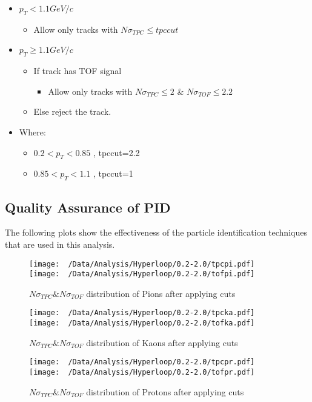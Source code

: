 \documentclass[ALICE,manyauthors]{ALICE_analysis_notes}
\begin{document}
\begin{enumerate}
	\begin{itemize}[label=@]
		\item $p_T<1.1GeV/c$
		\begin{itemize}[label=$\bullet$]
			\item Allow only tracks with $N\sigma_{TPC} \leq tpccut$
		\end{itemize}
		\item $p_T\geq 1.1GeV/c$
		\begin{itemize}[label=$\bullet$]
			\item If track has TOF signal
			\begin{itemize}[label=$\star$]
				\item Allow  only tracks with $N\sigma_{TPC} \leq 2$ \& $N\sigma_{TOF}\leq 2.2$
			\end{itemize}
			\item Else reject the track.
		\end{itemize}
		\item Where:	
		\begin{itemize}[label=]
			\item $0.2<p_T<0.85$ , tpccut=2.2
			\item $0.85<p_T<1.1$ , tpccut=1
		\end{itemize}
	\end{itemize}
\end{enumerate}
\subsection{Quality Assurance of PID}
The following plots show the effectiveness of the particle identification techniques that are used in this analysis. 
\begin{figure}[h!]
	\texttt{[image: ~/Data/Analysis/Hyperloop/0.2-2.0/tpcpi.pdf]}
	\texttt{[image: ~/Data/Analysis/Hyperloop/0.2-2.0/tofpi.pdf]}
	\caption{\label{Pion_nsigma}$N\sigma_{TPC}\&N\sigma_{TOF}$ distribution of Pions after applying cuts}
\end{figure}
\begin{figure}[h!]
	\texttt{[image: ~/Data/Analysis/Hyperloop/0.2-2.0/tpcka.pdf]}
	\texttt{[image: ~/Data/Analysis/Hyperloop/0.2-2.0/tofka.pdf]}
	\caption{\label{Kaon_nsigma}$N\sigma_{TPC}\&N\sigma_{TOF}$ distribution of Kaons after applying cuts}
\end{figure}
\begin{figure}[h!]
	\texttt{[image: ~/Data/Analysis/Hyperloop/0.2-2.0/tpcpr.pdf]}
	\texttt{[image: ~/Data/Analysis/Hyperloop/0.2-2.0/tofpr.pdf]}
	\caption{\label{Proton_nsigma}$N\sigma_{TPC}\&N\sigma_{TOF}$ distribution of Protons after applying cuts}
\end{figure}
\end{document}
